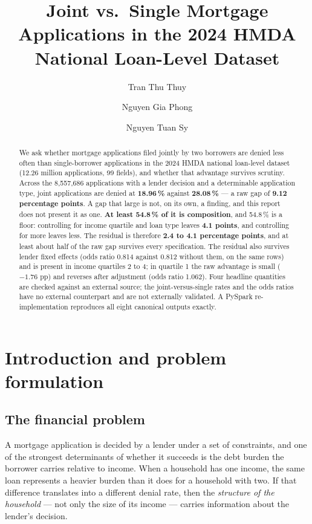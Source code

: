 \documentclass[sigconf,balance=false]{acmart}
\title{Joint vs.\ Single Mortgage Applications in the 2024 HMDA National
       Loan-Level Dataset}
\author{Tran Thu Thuy}
\affiliation{%
  \institution{Faculty of Data Science and Artificial Intelligence}
  \city{Hanoi}
  \country{Vietnam}}
\author{Nguyen Gia Phong}
\affiliation{%
  \institution{Faculty of Data Science and Artificial Intelligence}
  \city{Hanoi}
  \country{Vietnam}}
\author{Nguyen Tuan Sy}
\affiliation{%
  \institution{Faculty of Data Science and Artificial Intelligence}
  \city{Hanoi}
  \country{Vietnam}}
\begin{document}
\begin{abstract}
We ask whether mortgage applications filed jointly by two borrowers are
denied less often than single-borrower applications in the 2024 HMDA
national loan-level dataset (12.26 million applications, 99 fields), and
whether that advantage survives scrutiny. Across the 8{,}557{,}686
applications with a lender decision and a determinable application type,
joint applications are denied at \textbf{18.96\,\%} against
\textbf{28.08\,\%} --- a raw gap of \textbf{9.12 percentage points}. A gap
that large is not, on its own, a finding, and this report does not present
it as one. \textbf{At least 54.8\,\% of it is composition}, and 54.8\,\% is a
floor: controlling for income quartile and loan type leaves \textbf{4.1
points}, and controlling for more leaves less. The residual is therefore
\textbf{2.4 to 4.1 percentage points}, and at least about half of the raw
gap survives every specification. The residual also survives lender fixed
effects (odds ratio 0.814 against 0.812 without them, on the same rows) and
is present in income quartiles 2 to 4; in quartile 1 the raw advantage is
small ($-1.76$ pp) and reverses after adjustment (odds ratio 1.062). Four
headline quantities are checked against an external source; the
joint-versus-single rates and the odds ratios have no external counterpart
and are not externally validated. A PySpark re-implementation reproduces all
eight canonical outputs exactly.
\end{abstract}


\maketitle


\section{Introduction and problem formulation}\label{sec:introduction}

\subsection{The financial problem}\label{sec:intro}

A mortgage application is decided by a lender under a set of constraints, and
one of the strongest determinants of whether it succeeds is the debt burden
the borrower carries relative to income. When a household has one income, the
same loan represents a heavier burden than it does for a household with two.
If that difference translates into a different denial rate, then the
\emph{structure of the household} --- not only the size of its income ---
carries information about the lender's decision.
\end{document}
